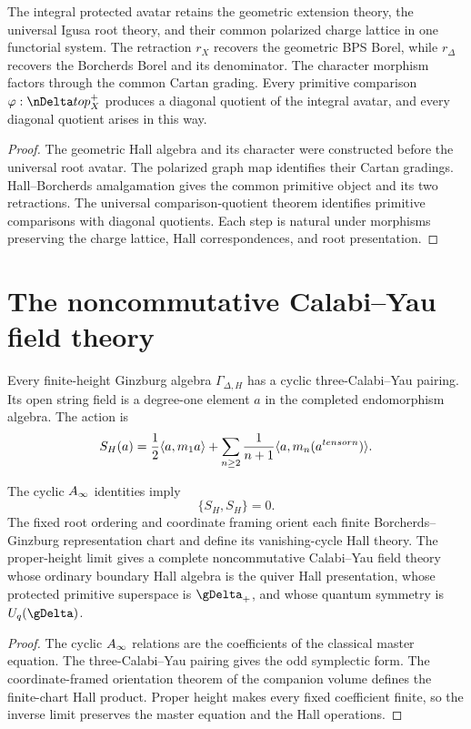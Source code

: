 \begin{theorem}
The integral protected avatar retains the geometric extension theory, the universal Igusa root theory, and their common polarized charge lattice in one functorial system.  The retraction $r_X$ recovers the geometric BPS Borel, while $r_\Delta$ recovers the Borcherds Borel and its denominator.  The character morphism factors through the common Cartan grading.  Every primitive comparison $\varphi:\nDelta\to\mathfrak p_X^+$ produces a diagonal quotient of the integral avatar, and every diagonal quotient arises in this way.
\end{theorem}
\begin{proof}
The geometric Hall algebra and its character were constructed before the universal root avatar.  The polarized graph map identifies their Cartan gradings.  Hall--Borcherds amalgamation gives the common primitive object and its two retractions.  The universal comparison-quotient theorem identifies primitive comparisons with diagonal quotients.  Each step is natural under morphisms preserving the charge lattice, Hall correspondences, and root presentation.
\end{proof}

\chapter{The noncommutative Calabi--Yau field theory}
Every finite-height Ginzburg algebra $\Gamma_{\Delta,H}$ has a cyclic three-Calabi--Yau pairing.  Its open string field is a degree-one element $a$ in the completed endomorphism algebra.  The action is
\[
 S_H(a)=
 \frac12\langle a,m_1a\rangle
 +\sum_{n\ge2}\frac1{n+1}\langle a,m_n(a^{tensor n})\rangle.
\]

\begin{theorem}
The cyclic $A_\infty$ identities imply
\[
 \{S_H,S_H\}=0.
\]
The fixed root ordering and coordinate framing orient each finite Borcherds--Ginzburg representation chart and define its vanishing-cycle Hall theory.  The proper-height limit gives a complete noncommutative Calabi--Yau field theory whose ordinary boundary Hall algebra is the quiver Hall presentation, whose protected primitive superspace is $\gDelta_+$, and whose quantum symmetry is $\widehat U_q(\gDelta)$.
\end{theorem}
\begin{proof}
The cyclic $A_\infty$ relations are the coefficients of the classical master equation.  The three-Calabi--Yau pairing gives the odd symplectic form.  The coordinate-framed orientation theorem of the companion volume defines the finite-chart Hall product.  Proper height makes every fixed coefficient finite, so the inverse limit preserves the master equation and the Hall operations.
\end{proof}

